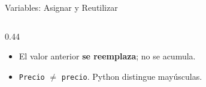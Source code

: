 \documentclass[aspectratio=169, 11pt]{beamer}
\begin{document}
\begin{frame}[fragile]{Variables: Asignar y Reutilizar}
\begin{columns}[T]
\begin{column}{0.44\textwidth}
      \vspace{1pt}
      {\scriptsize\color{textMuted}
      \begin{itemize}\setlength{\itemsep}{1pt}
        \item[{\color{arcaRed}\scriptsize\faExclamationTriangle}]
          El valor anterior \textbf{se reemplaza};
          no se acumula.
        \item[{\color{arcaRed}\scriptsize\faExclamationTriangle}]
          \texttt{Precio} $\neq$ \texttt{precio}.
          Python distingue mayúsculas.
      \end{itemize}
      }
    \end{column}
  \end{columns}
\end{frame}

\end{document}
